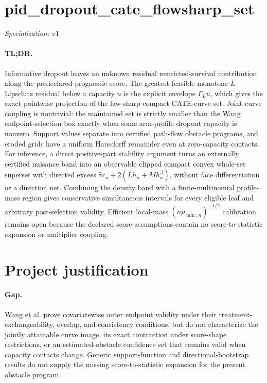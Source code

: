 \documentclass{article}
\begin{document}
\sloppy

\section*{pid\_\allowbreak{}dropout\_\allowbreak{}cate\_\allowbreak{}flowsharp\_\allowbreak{}set}

\noindent\textit{Specialization:} v1\par

\paragraph{TL;DR.} Informative dropout leaves an unknown residual restricted-survival contribution along the predeclared prognostic score. The greatest feasible monotone \(L\)-Lipschitz residual below a capacity \(u\) is the explicit envelope \(\Gamma_Lu\), which gives the exact pointwise projection of the law-sharp compact CATE-curve set. Joint curve coupling is nontrivial: the maintained set is strictly smaller than the Wang endpoint-selection box exactly when some arm-profile dropout capacity is nonzero. Support values separate into certified path-flow obstacle programs, and eroded grids have a uniform Hausdorff remainder even at zero-capacity contacts. For inference, a direct positive-part stability argument turns an externally certified nuisance band into an observable clipped compact convex whole-set superset with directed excess \(8r_n+2(Lh_n+Mh_n^\beta)\), without face differentiation or a direction net. Combining the density band with a finite-multinomial profile-mass region gives conservative simultaneous intervals for every eligible leaf and arbitrary post-selection validity. Efficient local-mass \((np_{\min,n})^{-1/2}\) calibration remains open because the declared score assumptions contain no score-to-statistic expansion or multiplier coupling.

\section{Project justification}

\paragraph{Gap.} Wang et al. prove covariatewise outer endpoint validity under their treatment-exchangeability, overlap, and consistency conditions, but do not characterize the jointly attainable curve image, its exact contraction under score-shape restrictions, or an estimated-obstacle confidence set that remains valid when capacity contacts change. Generic support-function and directional-bootstrap results do not supply the missing score-to-statistic expansion for the present obstacle program.
\end{document}
